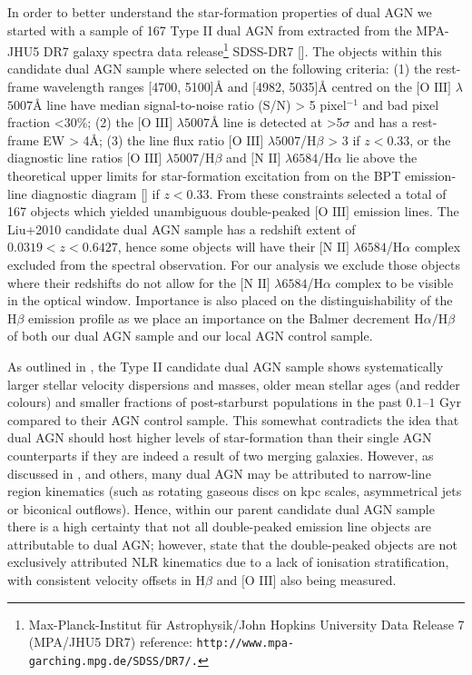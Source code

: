 In order to better understand the star-formation properties of dual AGN we started with a sample of 167 Type II dual AGN from \cite{Liu_2009} extracted from the MPA-JHU5 DR7 galaxy spectra data release\footnote{\tiny{Max-Planck-Institut für Astrophysik/John Hopkins University Data Release 7 (MPA/JHU5 DR7) reference: \tt{http://www.mpa-garching.mpg.de/SDSS/DR7/}.}} SDSS-DR7 [\cite{2009ApJS..182..543A}]. The objects within this candidate dual AGN sample where selected on the following criteria: (1) the rest-frame wavelength ranges [4700, 5100]\AA{} and [4982, 5035]\AA{} centred on the $\text{[O III]}$ $\lambda$$5007$\AA{} line have median signal-to-noise ratio (S/N) > 5 pixel$^{−1}$ and bad pixel fraction <30\%; (2) the $\text{[O III]}$ $\lambda$$5007$\AA{} line is detected at >5$\sigma$ and has a rest-frame EW > 4\AA; (3) the line flux ratio $\text{[O III]}$ $\lambda$$5007$/$\text{H}\beta$ > 3 if ${z}<{0.33}$, or the diagnostic line ratios $\text{[O III]}$ $\lambda$$5007$/$\text{H}\beta$ and $\text{[N II]}$ $\lambda$$6584$/$\text{H}\alpha$ lie above the theoretical upper limits for star-formation excitation from \cite{Kewley_Dopita_Sutherland_Heisler_Trevena_2001} on the BPT emission-line diagnostic diagram [\cite{Baldwin_1981}] if ${z}<{0.33}$. From these constraints \cite{Liu_2009} selected a total of 167 objects which yielded unambiguous double-peaked $\text{[O III]}$ emission lines. The Liu+2010 candidate dual AGN sample has a redshift extent of ${0.0319}<{z}<{0.6427}$, hence some objects will have their $\text{[N II]}$ $\lambda$$6584$/$\text{H}\alpha$ complex excluded from the spectral observation. For our analysis we exclude those objects where their redshifts do not allow for the $\text{[N II]}$ $\lambda$$6584$/$\text{H}\alpha$ complex to be visible in the optical window. Importance is also placed on the distinguishability of the $\text{H}\beta$ emission profile as we place an importance on the Balmer decrement $\text{H}\alpha/\text{H}\beta$ of both our dual AGN sample and our local AGN control sample.

As outlined in \cite{Liu_2009}, the Type II candidate dual AGN sample shows systematically larger stellar velocity dispersions and masses, older mean stellar ages (and redder colours) and smaller fractions of post-starburst populations in the past $0.1–1$ Gyr compared to their AGN control sample. This somewhat contradicts the idea that dual AGN should host higher levels of star-formation than their single AGN counterparts if they are indeed a result of two merging galaxies. However, as discussed in \cite{Liu_2009}, and others, many dual AGN may be attributed to narrow-line region kinematics (such as rotating gaseous discs on kpc scales, asymmetrical jets or biconical outflows). Hence, within our parent candidate dual AGN sample there is a high certainty that not all double-peaked emission line objects are attributable to dual AGN; however, \cite{Liu_2009} state that the double-peaked objects are not exclusively attributed NLR kinematics due to a lack of ionisation stratification, with consistent velocity offsets in $\text{H}\beta$ and $\text{[O III]}$ also being measured.

